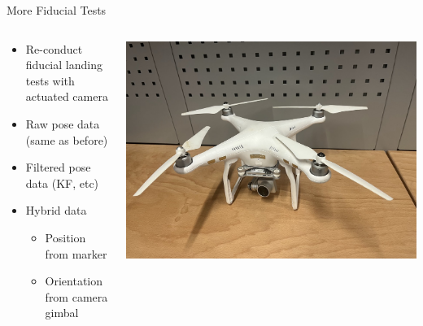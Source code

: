 \documentclass[aspectratio=169]{beamer}
\begin{document}
\begin{frame}{More Fiducial Tests}
\begin{columns}
	\begin{column}{0.5\textwidth}
	\begin{itemize}
		\item Re-conduct fiducial landing tests with actuated camera
		\item Raw pose data (same as before)
		\item Filtered pose data (KF, etc)
		\item Hybrid data
		\begin{itemize}
			\item Position from marker
			\item Orientation from camera gimbal
		\end{itemize}
	\end{itemize}
	\end{column}
	\begin{column}{0.5\textwidth}
		\includegraphics[width=\textwidth]{./images/phantom_3}
	\end{column}
\end{columns}
\end{frame}
\end{document}
